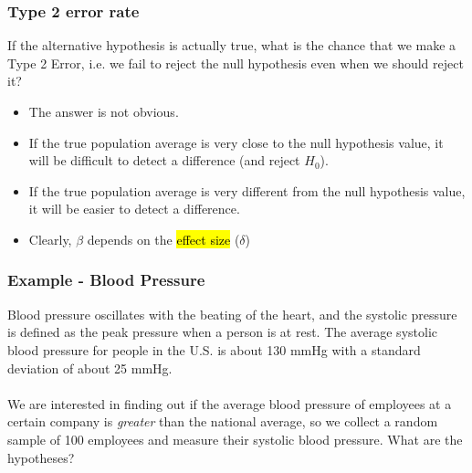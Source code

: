 \begin{frame}
\frametitle{Type 2 error rate}

If the alternative hypothesis is actually true, what is the chance that we make a Type 2 Error, i.e. we fail to reject the null hypothesis even when we should reject it?

\begin{itemize}

\item The answer is not obvious.

\item If the true population average is very close to the null hypothesis value, it will be difficult to detect a difference (and reject $H_0$).

\item If the true population average is very different from the null hypothesis value, it will be easier to detect a difference.

\item Clearly, $\beta$ depends on the \hl{effect size} ($\delta$)
\end{itemize}

\end{frame}


\begin{frame}
\frametitle{Example - Blood Pressure}
{\footnotesize
Blood pressure oscillates with the beating of the heart, and the systolic pressure is defined as the peak pressure when a person is at rest. The average systolic blood pressure for people in the U.S. is about 130 mmHg with a standard deviation of about 25 mmHg. \\
~\\
We are interested in finding out if the average blood pressure of employees at a certain company is \emph{greater} than the national average, so we collect a random sample of 100 employees and measure their systolic blood pressure. What are the hypotheses?


}
\end{frame}


